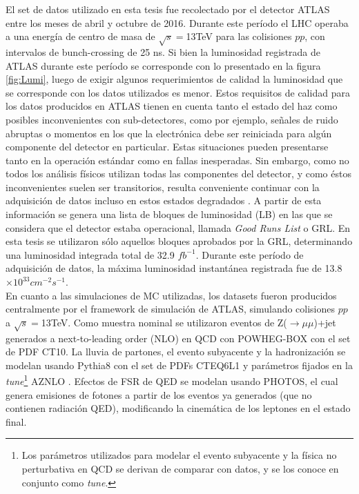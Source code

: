 El set de datos utilizado en esta tesis fue recolectado por el detector ATLAS entre los meses de abril y octubre de 2016. Durante este período el LHC operaba a una energía de centro de masa de $\sqrt{s}=$13TeV para las colisiones $pp$, con intervalos de bunch-crossing de 25 ns. Si bien la luminosidad registrada de ATLAS durante este período se corresponde con lo presentado en la figura \ref{fig:Lumi}, luego de exigir algunos requerimientos de calidad la luminosidad que se corresponde con los datos utilizados es menor. Estos requisitos de calidad para los datos producidos en ATLAS tienen en cuenta tanto el estado del haz como posibles inconvenientes con sub-detectores, como por ejemplo, señales de ruido abruptas o momentos en los que la electrónica debe ser reiniciada para algún componente del detector en particular. Estas situaciones pueden presentarse tanto en la operación estándar como en fallas inesperadas. Sin embargo, como no todos los análisis físicos utilizan todas las componentes del detector, y como éstos inconvenientes suelen ser transitorios, resulta conveniente continuar con la adquisición de datos incluso en estos estados degradados \cite{DataQuality}. A partir de esta información se genera una lista de bloques de luminosidad (LB) en las que se considera que el detector estaba operacional, llamada \textit{Good Runs List} o GRL\cite{GRL}. En esta tesis se utilizaron sólo aquellos bloques aprobados por la GRL, determinando una luminosidad integrada total de 32.9 $fb^{-1}$.
Durante este período de adquisición de datos, la máxima luminosidad instantánea registrada fue de 13.8$\times 10^{33}cm^{-2}s^{-1}$. \\

En cuanto a las simulaciones de MC utilizadas, los datasets fueron producidos centralmente por el framework de simulación de ATLAS\cite{AtlasSimulation}, simulando colisiones $pp$ a $\sqrt{s}=$13TeV. Como muestra nominal se utilizaron eventos de Z($\rightarrow\mu\mu$)+jet generados a next-to-leading order (NLO) en QCD con POWHEG-BOX \cite{Powheg} con el set de PDF CT10\cite{CT10}. La lluvia de partones, el evento subyacente y la hadronización se modelan usando Pythia8 \cite{Pythia} con el set de PDFs CTEQ6L1 y parámetros fijados en la \textit{tune}\footnote{Los parámetros utilizados para modelar el evento subyacente y la física no perturbativa en QCD se derivan de comparar con datos, y se los conoce en conjunto como \textit{tune}.} AZNLO \cite{AZNLO}. Efectos de FSR de QED se modelan usando PHOTOS, el cual genera emisiones de fotones a partir de los eventos ya generados (que no contienen radiación QED), modificando la cinemática de los leptones en el estado final.

